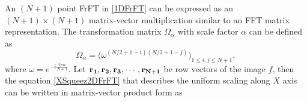 \documentclass{UCF_ETD}
\begin{document}
 An $(N+1)$ point FrFT in \eqref{1DFrFT} can be expressed as an $(N+1)\times (N+1)$ matrix-vector multiplication similar to an FFT matrix representation. The transformation matrix $\Omega_{\alpha}$ with scale factor $\alpha$ can be defined as
 $$ \Omega_\alpha=\big(\omega^{(N/2+1-i)(N/2+1-j)}\big)_{1\le i, j\le N+1},$$
 where
 $ \omega = e^{-i\frac{2\pi\alpha}{N+1}}$.
 Let ${\bf r_1,r_2,r_3,\cdots, r_{N+1}}$ be row vectors of the image $f$, then the equation \eqref{XSqueez2DFrFT} that describes the uniform scaling along $X$ axis can be written in matrix-vector product form as
\end{document}
